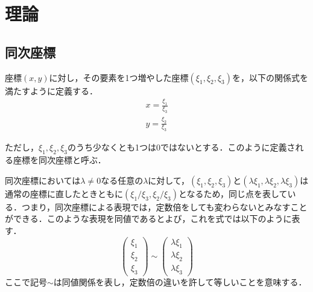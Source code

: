 \documentclass[openright]{nitocs}
\numberwithin{equation}{section}
\begin{document}
    \section{理論} %
    \label{config}
        \subsection{同次座標}
            座標$(x,y)$に対し，その要素を1つ増やした座標$(\xi_1,\xi_2,\xi_3)$を，以下の関係式を満たすように定義する．\\
            \begin{equation} %
                \begin{split} %
                    x = \frac{\xi_1}{\xi_3} \\ 
                    y = \frac{\xi_2}{\xi_3}
                \end{split}
                \label{Homogeneous}
            \end{equation}

            ただし，$\xi_1,\xi_2,\xi_3$のうち少なくとも1つは0ではないとする．このように定義される座標を同次座標と呼ぶ\cite{DIP}．

            同次座標においては$\lambda\neq0$なる任意の$\lambda$に対して，$(\xi_1,\xi_2,\xi_3)$と$(\lambda\xi_1,\lambda\xi_2,\lambda\xi_3)$は通常の座標に直したときともに$(\xi_1/\xi_3,\xi_2/\xi_3)$となるため，同じ点を表している．つまり，同次座標による表現では，定数倍をしても変わらないとみなすことができる．このような表現を同値であるとよび，これを式では以下のように表す．
            \begin{equation} %
                \left(
                    \begin{array}{ccc}
                        \xi_1\\
                        \xi_2\\
                        \xi_3
                    \end{array}
                \right) \sim %
                \left(
                    \begin{array}{ccc}
                        \lambda\xi_1\\
                        \lambda\xi_2\\
                        \lambda\xi_3
                    \end{array}
                \right)
            \end{equation}
            ここで記号$\sim$は同値関係を表し，定数倍の違いを許して等しいことを意味する．
\end{document}
